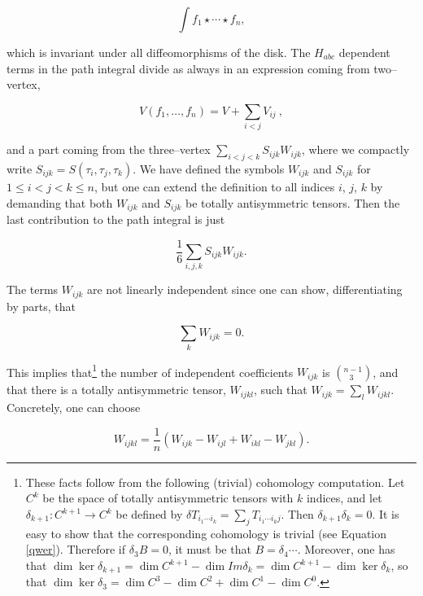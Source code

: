 \documentclass[a4paper,11pt]{article}
\newcommand{\func}[1]{{#1}}
\begin{document}
$$
\int f_{1}\star \cdots \star f_{n},
$$

\noindent
which is invariant under all diffeomorphisms of the disk. The $H_{abc}$ 
dependent terms in the path integral divide as always in an expression 
coming from two--vertex,

\begin{equation}
V\left( f_{1}, \dots, f_{n}\right) =V+\sum_{i<j}V_{ij}\ , \label{eq2000}
\end{equation}

\noindent
and a part coming from the three--vertex $\sum_{i<j<k} S_{ijk} W_{ijk}$, 
where we compactly write $S_{ijk}=S\left(\tau_{i},\tau_{j},\tau_{k}\right)$.
We have defined the symbols $W_{ijk}$ and $S_{ijk}$ for $1\leq i<j<k \leq n$,
but one can extend the definition to all indices $i$, $j$, $k$ by demanding 
that both $W_{ijk}$ and $S_{ijk}$ be totally antisymmetric tensors.
Then the last contribution to the path integral is just

\begin{equation}
\frac{1}{6}\sum_{i,j,k}S_{ijk}W_{ijk}.  \label{eq1000}
\end{equation}

\noindent
The terms $W_{ijk}$ are not linearly independent since one can show,
differentiating by parts, that 

$$
\sum_{k}W_{ijk}=0.
$$

\noindent
This implies that\footnote{
These facts follow from the following (trivial) cohomology computation. 
Let $C^{k}$ be the space of totally antisymmetric tensors with $k$ indices, 
and let $\delta _{k+1}:C^{k+1}\rightarrow C^{k}$ be defined by $\delta
T_{i_{1}\cdots i_{k}}=\sum_{j}T_{i_{1}\cdots i_{k}j}$. Then $\delta
_{k+1}\delta _{k}=0$. It is easy to show that the corresponding cohomology
is trivial (see Equation \ref{qwer}).
Therefore if $\delta _{3}B=0$, it must be that $B=\delta
_{4}\cdots $. Moreover, one has that $\dim \ker \delta _{k+1}=\dim
C^{k+1}-\dim \func{Im}\delta _{k}=\dim C^{k+1}-\dim \ker \delta _{k}$, so
that $\dim \ker \delta _{3}=\dim C^{3}-\dim C^{2}+\dim C^{1}-\dim C^{0}$.}
the number of independent coefficients $W_{ijk}$ is $\left( ^{n-1} 
_{\;\;\, 3} \right)$, and that there is a totally antisymmetric tensor, 
$W_{ijkl}$, such that $W_{ijk}=\sum_{l}W_{ijkl}$. Concretely, one can choose 

\begin{equation}
W_{ijkl}=\frac{1}{n}\left( W_{ijk}-W_{ijl}+W_{ikl}-W_{jkl}\right).    \label{qwer}
\end{equation}
\end{document}
